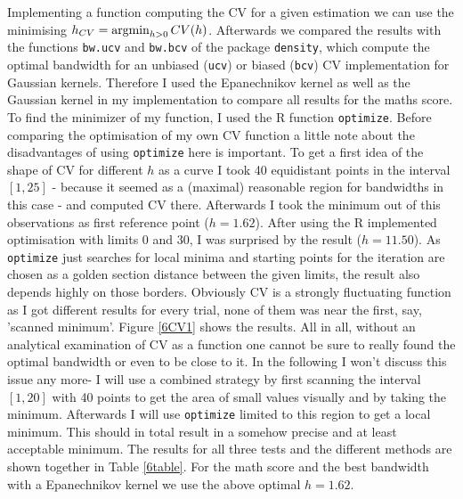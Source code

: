 Implementing a function computing the CV for a given estimation we can use the minimising $h_{CV}=\operatorname*{argmin} _{h>0} CV(h)$.
Afterwards we compared the results with the functions \texttt{bw.ucv} and \texttt{bw.bcv} of the package \texttt{density}, which compute the optimal bandwidth for an unbiased (\texttt{ucv}) or biased (\texttt{bcv}) CV implementation for Gaussian kernels. 
Therefore I used the Epanechnikov kernel as well as the Gaussian kernel in my implementation to compare all results for the maths score. To find the minimizer of my function, I used the R function \texttt{optimize}. Before comparing the optimisation of my own CV function a little note about the disadvantages of using \texttt{optimize} here is important. 
To get a first idea of the shape of CV for different $h$ as a curve I took 40 equidistant points in the interval $[1,25]$ - because it seemed as a (maximal) reasonable region for bandwidths in this case -  and computed CV there. Afterwards I took the minimum out of this observations as first reference point ($h=1.62$). After using the R implemented optimisation with limits 0 and 30, I was surprised by the result ($h=11.50$). As \texttt{optimize} just searches for local minima and starting points for the iteration are chosen as a golden section distance between the given limits, the result also depends highly on those borders. Obviously CV is a strongly fluctuating function as I got different results for every trial, none of them was near the first, say, 'scanned minimum'. Figure \ref{6CV1} shows the results. All in all, without an analytical examination of CV as a function one cannot be sure to really found the optimal bandwidth or even to be close to it. In the following I won't discuss this issue any more- I will use a combined strategy by first scanning the interval $[1, 20]$ with 40 points to get the area of small values visually and by taking the minimum. Afterwards I will use \texttt{optimize} limited to this region to get a local minimum. This should in total result in a somehow precise and at least acceptable minimum. The results for all three tests and the different methods are shown together in Table \ref{6table}. For the math score and the best bandwidth with a Epanechnikov kernel we use the above optimal $h=1.62$. 
